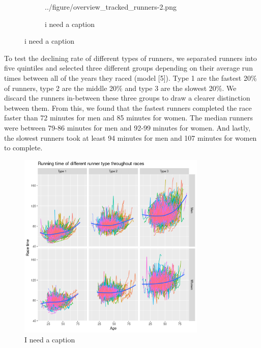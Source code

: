 \documentclass[12pt]{article}
\begin{document}
\begin{figure}
\begin{subfigure}[]{0.49\textwidth}
		{../figure/overview_tracked_runners-2.png}
		\caption{i need a caption}
		\label{top-10-tracked}
	\end{subfigure}
	\caption{i need a caption}
	\label{type123}
\end{figure}



To test the declining rate of different types of runners,
we separated runners into five quintiles and selected three different
groups depending on their average run times between all of the years they
raced
(model [5]).
Type 1 are the fastest 20\% of runners, type 2 are the middle 20\% and
type 3 are the slowest 20\%.
We discard the runners in-between these three groups to draw a clearer
distinction between them.
From this, we found that the fastest runners completed the race faster
than 72 minutes for men and 85 minutes for women.
The median runners were between 79-86 minutes for men and 92-99 minutes
for women.
And lastly, the slowest runners took at least 94 minutes for men and
107 minutes for women to complete.

\begin{figure}[ht]
	\centering
	\includegraphics[width = 0.8\textwidth]
	{../figure/run_type2_gr-1.png}
	\caption{I need a caption}
	\label{type123-trend}
\end{figure}
\end{document}

